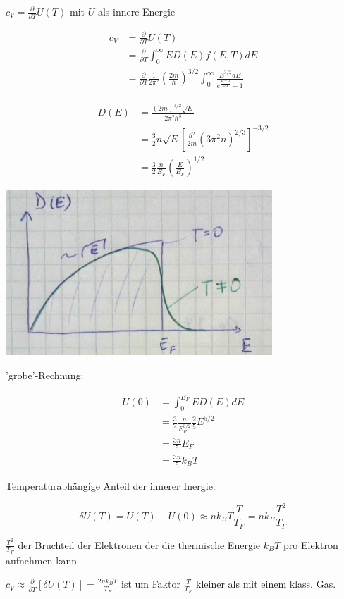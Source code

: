 \(c_V = \frac{\partial }{\partial T}U(T)\) mit \(U\) als innere Energie

\begin{align}
c_V &= \frac{\partial }{\partial T}U(T)\\
&= \frac{\partial }{\partial T}\int_0^\infty ED(E)f(E,T)dE\\
&=\frac{\partial }{\partial T}\frac{1}{2\pi^2}\left(\frac{2m}{\hbar}\right)^{3/2}\int_0^\infty\frac{E^{3/2}dE}{e^{\frac{E-\mu}{k_BT}}-1}
\end{align}

\begin{align}
D(E)&=\frac{(2m)^{3/2}\sqrt{E}}{2\pi^2\hbar^3}\\
&=\frac{3}{2}n\sqrt{E}\left[\frac{\hbar^2}{2m}(3\pi^2 n)^{2/3}\right]^{-3/2}\\
&= \frac{3}{2}\frac{n}{E_F}\left(\frac{E}{E_F}\right)^{1/2}
\end{align}


\includegraphics[width=0.75\textwidth]{kap06_25.png}

'grobe'-Rechnung:

\begin{align}
U(0) &= \int_0^{E_F}ED(E)dE\\
&= \frac{3}{2}\frac{n}{E_F^{3/2}}\frac{2}{5}E^{5/2}\\
&=\frac{3n}{5}E_F\\
&=\frac{3n}{5}k_BT
\end{align}

Temperaturabhängige Anteil der innerer Inergie:

\[\delta U(T) = U(T)-U(0) \approx nk_BT\frac{T}{T_F} = nk_B \frac{T^2}{T_F}\]

\(\frac{T^2}{T_F}\) der Bruchteil der Elektronen der die thermische Energie \(k_BT\) pro Elektron aufnehmen kann

\(c_V \approx \frac{\partial}{\partial T}[\delta U(T)] = \frac{2nk_BT}{T_F}\) ist um Faktor \(\frac{T}{T_F}\) kleiner als mit einem klass. Gas.

